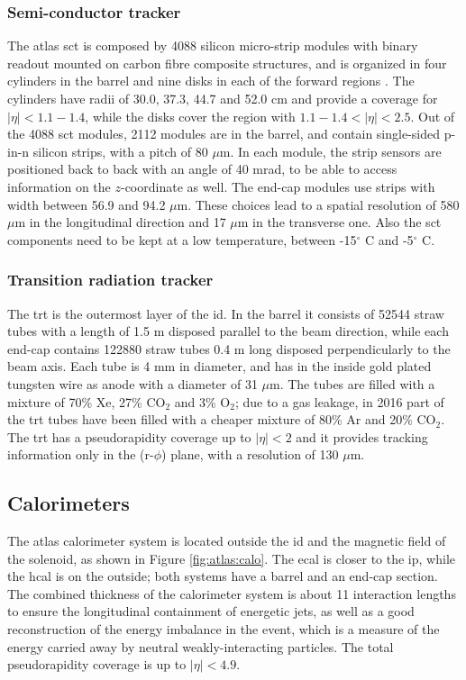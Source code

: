 \subsubsection*{Semi-conductor tracker}
The \gls{atlas} \gls{sct} is composed by 4088 silicon micro-strip modules with binary readout mounted on carbon fibre composite structures, and is organized in four cylinders in the barrel and nine disks in each of the forward regions \cite{Jackson:sct}. The cylinders have  radii of 30.0, 37.3, 44.7 and 52.0 cm and provide a coverage for $|\eta|<1.1-1.4$, while the disks cover the region with $1.1-1.4<|\eta|<2.5$. 
Out of the 4088 \gls{sct} modules, 2112 modules are in the barrel, 
and contain single-sided p-in-n silicon strips, with a pitch of 80 $\mu$m. 
In each module, the strip sensors are positioned back to back with an angle of 40 mrad, to be able to access information on the $z$-coordinate as well. The end-cap modules use strips with width between 56.9 and 94.2 $\mu$m. 
These choices lead to a spatial resolution of 580 $\mu$m in the longitudinal direction and 17 $\mu$m in the transverse one.
Also the \gls{sct} components need to be kept at a low temperature, between -15$^{\circ}$ C and -5$^{\circ}$ C.

\subsubsection*{Transition radiation tracker}

The \gls{trt} is the outermost layer of the \gls{id}. In the barrel it consists of 52544 straw tubes with a length of 1.5 m disposed parallel to the beam direction, while each end-cap contains 122880 straw tubes 0.4 m long disposed perpendicularly to the beam axis. Each tube is 4 mm in diameter, and has in the inside gold plated tungsten wire as anode with a diameter of 31 $\mu$m. The tubes are filled with a mixture of 70\% Xe, 27\% CO$_2$ and 3\% O$_2$; due to a gas leakage, in 2016 part of the \gls{trt} tubes have been filled with a cheaper mixture of 80\% Ar and 20\% CO$_2$. The \gls{trt} has a pseudorapidity coverage up to $|\eta|<2$ and it provides tracking information only in the (r-$\phi$) plane, with a resolution of 130 $\mu$m.


\subsection{Calorimeters}
\label{sec:atlas:calo}

The \gls{atlas} calorimeter system is located outside the \gls{id} and the magnetic field of the solenoid, as shown in Figure \ref{fig:atlas:calo}. The \gls{ecal} is closer to the \gls{ip}, while the \gls{hcal} is on the outside; both systems have a barrel and an end-cap section. 
The combined thickness of the calorimeter system is about 11 interaction lengths to ensure the longitudinal containment of energetic jets, 
as well as a good reconstruction of the energy imbalance in the event, which is a measure of the energy carried away by neutral weakly-interacting particles. The total pseudorapidity coverage is up to $|\eta|<4.9$. 

